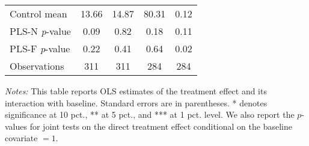 \begin{table}[ht]
{\begin{threeparttable}
\begin{tabular}{l*{4}{c}}
Control mean    &    13.66         &    14.87         &    80.31         &     0.12         \\
PLS-N \emph{p}-value&     0.09         &     0.82         &     0.18         &     0.11         \\
PLS-F \emph{p}-value&     0.22         &     0.41         &     0.64         &     0.02         \\
Observations    &      311         &      311         &      284         &      284         \\
\bottomrule \end{tabular} \begin{tablenotes}[flushleft] \footnotesize \item \emph{Notes:} This table reports OLS estimates of the treatment effect and its interaction with baseline. Standard errors are in parentheses. * denotes significance at 10 pct., ** at 5 pct., and *** at 1 pct. level. We also report the \(p\)-values for joint tests on the direct treatment effect conditional on the baseline covariate $= 1$. \end{tablenotes} \end{threeparttable} } \end{table}

